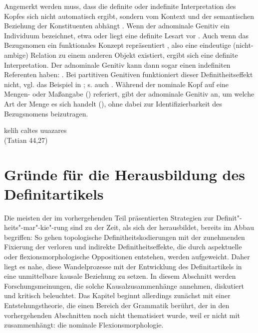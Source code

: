 \noindent
Angemerkt werden muss, dass die definite oder indefinite  Interpretation des Kopfes sich nicht automatisch ergibt, sondern vom Kontext und der semantischen Beziehung der Konstituenten abhängt \parencite[237]{Oubouzar1997}.
Wenn der adnominale Genitiv  ein Individuum bezeichnet, etwa   oder   liegt eine definite Lesart vor \parencite[vgl.][194]{Szczepaniak2015}. Auch wenn das Bezugsnomen ein funktionales Konzept repräsentiert \parencite{Lobner1985}, also eine eindeutige (nicht-ambige) Relation zu einem anderen Objekt existiert, ergibt sich eine definite Interpretation. Der adnominale Genitiv  kann dann sogar einen indefiniten  Referenten haben:  \parencite[109]{Demske2001}. Bei partitiven  Genitiven funktioniert dieser Definitheitseffekt  nicht, vgl. das Beispiel in ; s. auch \textcite[][194]{Szczepaniak2015}. Während der nominale Kopf auf eine Mengen- oder Maßangabe () referiert, gibt der adnominale Genitiv  an, um welche Art der Menge es sich handelt (), ohne dabei zur Identifizierbarkeit des Bezugsnomens beizutragen. 

\begin{exe}
	\ex \label{ex:partitiv-ahd}   
	kelih caltes uuazares  \\
	 (Tatian 44,27)
\end{exe}

\section{Gründe für die Herausbildung des Definitartikels}\label{sec:gruende}

Die meisten der im vorhergehenden Teil präsentierten Strategien zur Definit"-heits"-mar"-kie"-rung sind zu der Zeit, als sich der  herausbildet, bereits im Abbau begriffen: So gehen topologische Definitheitskodierungen  mit der zunehmenden Fixierung der  verloren und indirekte Definitheitseffekte,  die durch aspektuelle  oder flexionsmorphologische  Oppositionen entstehen, werden aufgeweicht. Daher liegt es nahe, diese Wandelprozesse mit der Entwicklung des Definitartikels  in eine unmittelbare kausale Beziehung zu setzen. In diesem Abschnitt werden Forschungsmeinungen, die solche Kausalzusammenhänge annehmen, diskutiert und kritisch beleuchtet. Das Kapitel beginnt allerdings zunächst mit einer Entstehungstheorie, die einen Bereich der Grammatik berührt, der in den vorhergehenden Abschnitten noch nicht thematisiert wurde, weil er nicht mit  zusammenhängt: die nominale Flexionsmorphologie. 

